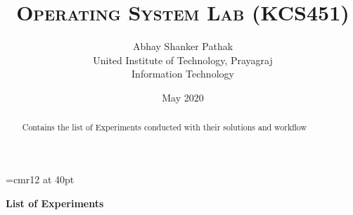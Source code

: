 \documentclass[13pt,a4paper,oneside]{article}
\begin{document}
\font\myfont=cmr12 at 40pt

\title{\textsc{\myfont Operating System Lab (KCS451)}}
\vskip 1cm
\author{\Huge Abhay Shanker Pathak\\United Institute of Technology, Prayagraj\\Information Technology}
\vskip 1cm
\date{May 2020}

\maketitle
\setlength{\parindent}{1cm}

\renewcommand{\abstractname}{About}

\begin{abstract}
	\begin{center}
		\Large{Contains the list of Experiments conducted with their solutions and workflow}
	\end{center}
\end{abstract}

\clearpage


\begin{center}
	\Large{\textbf{List of Experiments}}
\end{center}
\end{document}
